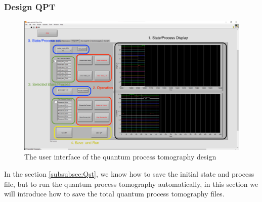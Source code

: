 \documentclass{article}
\begin{document}
\subsubsection{Design QPT}
\begin{figure}[htbp]
    \centering
    \includegraphics[width=1\linewidth]{fig/Process Selection.png}
    \caption{The user interface of the quantum process tomography design}
    \label{fig:process selection}
\end{figure}
In the section \ref{subsubsec:Qst}, we know how to save the initial state and process file, but to run the quantum process tomography automatically, in this section we will introduce how to save the total quantum process tomography files.
\end{document}
